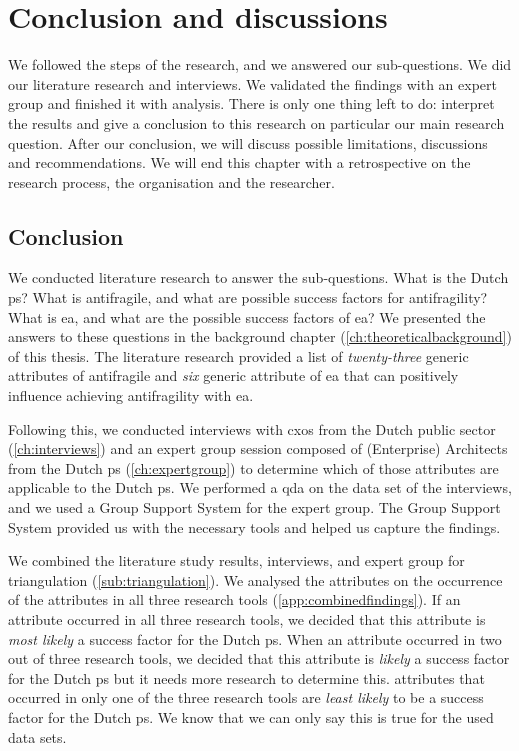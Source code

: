 \chapter{Conclusion and discussions}
\label{ch:conclusionanddiscussions}
We followed the steps of the research, and we answered our sub-questions. We did our literature research and interviews. We validated the findings with an expert group and finished it with analysis. There is only one thing left to do: interpret the results and give a conclusion to this research on particular our main research question. After our conclusion, we will discuss possible limitations, discussions and recommendations. We will end this chapter with a retrospective on the research process, the organisation and the researcher.

\section{Conclusion}
\label{sec:conclusion}
We conducted literature research to answer the sub-questions. What is the Dutch \gls{ps}? What is \gls{antifragile}, and what are possible success factors for \gls{antifragility}? What is \acrlong{ea}, and what are the possible success factors of \acrlong{ea}? We presented the answers to these questions in the background chapter (\cref{ch:theoreticalbackground}) of this thesis. The literature research provided a list of \textit{twenty-three} generic \glspl{attribute} of \gls{antifragile} and \textit{six} generic \gls{attribute} of \acrlong{ea} that can positively influence achieving \gls{antifragility} with \acrlong{ea}.

Following this, we conducted interviews with \glspl{cxo} from the Dutch public sector (\cref{ch:interviews}) and an expert group session composed of (Enterprise) Architects from the Dutch \gls{ps} (\cref{ch:expertgroup}) to determine which of those \glspl{attribute} are applicable to the Dutch \gls{ps}. We performed a \acrlong{qda} on the data set of the interviews, and we used a Group Support System for the expert group. The Group Support System provided us with the necessary tools and helped us capture the findings. 

We combined the literature study results, interviews, and expert group for \gls{triangulation} (\cref{sub:triangulation}). We analysed the \glspl{attribute} on the occurrence of the \glspl{attribute} in all three research tools (\cref{app:combinedfindings}). If an \gls{attribute} occurred in all three research tools, we decided that this \gls{attribute} is \textit{most likely} a success factor for the Dutch \gls{ps}. When an \gls{attribute} occurred in two out of three research tools, we decided that this \gls{attribute} is \textit{likely} a success factor for the Dutch \gls{ps} but it needs more research to determine this. \Glspl{attribute} that occurred in only one of the three research tools are \textit{least likely} to be a success factor for the Dutch \gls{ps}. We know that we can only say this is true for the used data sets.

